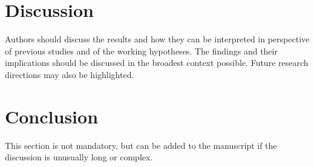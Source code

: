 \documentclass[preprint,
3p]{elsarticle} %
\begin{document}
\hypertarget{discussion}{%
\section{Discussion}\label{discussion}}

Authors should discuss the results and how they can be interpreted in
perspective of previous studies and of the working hypotheses. The
findings and their implications should be discussed in the broadest
context possible. Future research directions may also be highlighted.

\hypertarget{conclusion}{%
\section{Conclusion}\label{conclusion}}

This section is not mandatory, but can be added to the manuscript if the
discussion is unusually long or complex.

\renewcommand\refname{References}

\end{document}
